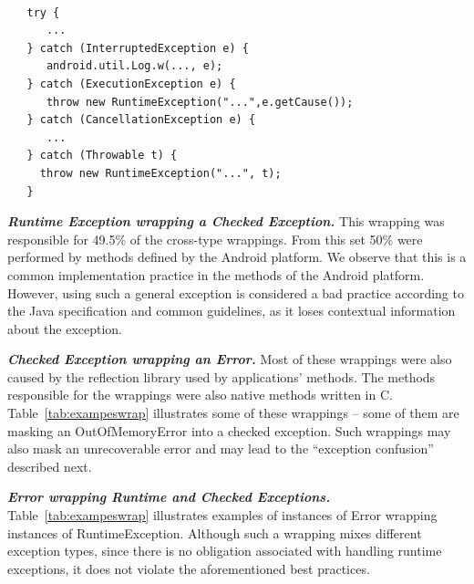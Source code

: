 

{\footnotesize
\begin{verbatim}
  
   try {
      ...
   } catch (InterruptedException e) {
      android.util.Log.w(..., e);
   } catch (ExecutionException e) {
      throw new RuntimeException("...",e.getCause());
   } catch (CancellationException e) {
      ...
   } catch (Throwable t) {
     throw new RuntimeException("...", t);
   }
\end{verbatim}
}

\emph{\textbf{Runtime Exception wrapping a Checked Exception.}} 
This wrapping was responsible for 49.5\% of
the cross-type wrappings.  From this set 50\%  were performed by methods defined by the Android platform. 
We observe that this is a common implementation practice in the methods of the Android platform.
However, using such a general exception is considered a bad practice
according to the Java specification and common guidelines, as it loses contextual information about the exception.

\bigskip


\bigskip

\emph{\textbf{Checked Exception wrapping an Error.}} Most of these wrappings
 were also caused by the reflection library used by applications' methods. The methods responsible for the wrappings
were also native methods written in C. Table~\ref{tab:exampeswrap} illustrates
some of these wrappings -- some of them are masking an OutOfMemoryError
into a checked exception. Such wrappings may also mask an unrecoverable error
and may lead to the ``exception confusion'' described next.

\emph{\textbf{Error wrapping Runtime and Checked Exceptions.}} Table~\ref{tab:exampeswrap}  illustrates
examples of instances of Error wrapping instances of
RuntimeException. 
Although such a wrapping mixes different exception types,
since there is no obligation associated with handling runtime exceptions, it
does not violate the aforementioned best practices. 

